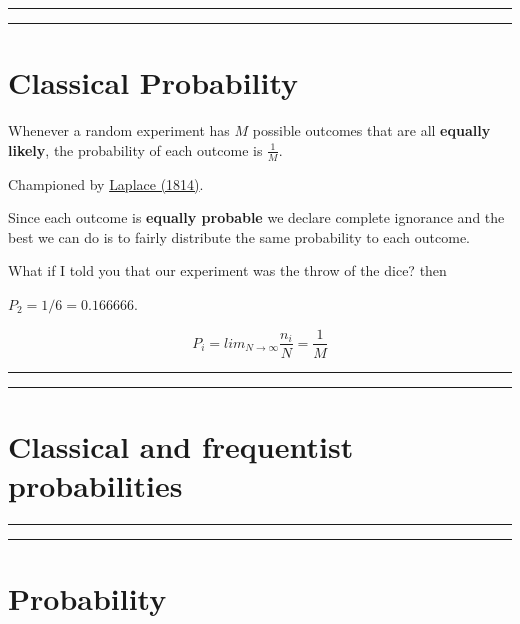 \documentclass[
]{book}
\begin{document}
\begin{center}\rule{0.5\linewidth}{0.5pt}\end{center}

\begin{center}\rule{0.5\linewidth}{0.5pt}\end{center}

\hypertarget{classical-probability}{%
\section{Classical Probability}\label{classical-probability}}

Whenever a random experiment has \(M\) possible outcomes that are all \textbf{equally likely}, the probability of each outcome is \(\frac{1}{M}\).

Championed by \href{https://plato.stanford.edu/entries/probability-interpret/\#ClaPro}{Laplace (1814)}.

Since each outcome is \textbf{equally probable} we declare complete ignorance and the best we can do is to fairly distribute the same probability to each outcome.

What if I told you that our experiment was the throw of the dice? then

\(P_2=1/6=0.166666\).

\[P_i=lim_{N\rightarrow \infty} \frac{n_i}{N}=\frac{1}{M}\]

\begin{center}\rule{0.5\linewidth}{0.5pt}\end{center}

\begin{center}\rule{0.5\linewidth}{0.5pt}\end{center}

\hypertarget{classical-and-frequentist-probabilities}{%
\section{Classical and frequentist probabilities}\label{classical-and-frequentist-probabilities}}

\begin{center}\rule{0.5\linewidth}{0.5pt}\end{center}

\begin{center}\rule{0.5\linewidth}{0.5pt}\end{center}

\hypertarget{probability-2}{%
\section{Probability}\label{probability-2}}
\end{document}
